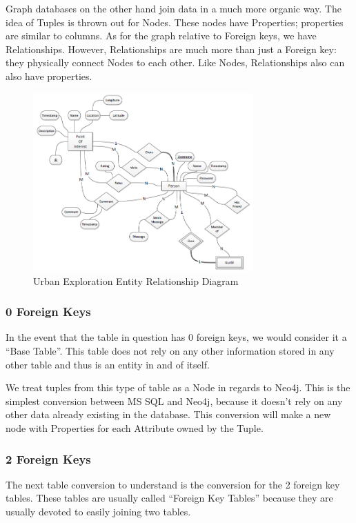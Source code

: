 \documentclass{acm_proc_article-sp}
\begin{document}
Graph databases on the other hand join data in a much more organic way. The idea of Tuples is thrown out for Nodes. These nodes have Properties; properties are similar to columns. As for the graph relative to Foreign keys, we have Relationships. However, Relationships are much more than just a Foreign key: they physically connect Nodes to each other. Like Nodes, Relationships also can also have properties.

\begin{figure}
  \centering
  \includegraphics[width=0.75\textwidth]{Images/URBEX_ERD}
  \caption{Urban Exploration Entity Relationship Diagram}
\end{figure}

\subsubsection{0 Foreign Keys}

In the event that the table in question has 0 foreign keys, we would consider it a ``Base Table''. This table does not rely on any other information stored in any other table and thus is an entity in and of itself.

We treat tuples from this type of table as a Node in regards to Neo4j. This is the simplest conversion between MS SQL and Neo4j, because it doesn't rely on any other data already existing in the database. This conversion will make a new node with Properties for each Attribute owned by the Tuple.

\subsubsection{2 Foreign Keys}

The next table conversion to understand is the conversion for the 2 foreign key tables. These tables are usually called ``Foreign Key Tables'' because they are usually devoted to easily joining two tables.
\end{document}
